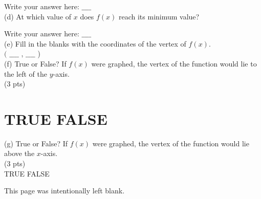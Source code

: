 \documentclass{ximera}
\begin{document}
Write your answer here: $\_\_\_\_$\\
(d) At which value of $x$ does $f(x)$ reach its minimum value?

Write your answer here: $\_\_\_\_$\\
(e) Fill in the blanks with the coordinates of the vertex of $f(x)$.\\
$($ $\_\_\_\_$ , $\_\_\_\_$ )\\
(f) True or False? If $f(x)$ were graphed, the vertex of the function would lie to the left of the $y$-axis.\\
(3 pts)

\section*{TRUE FALSE}
(g) True or False? If $f(x)$ were graphed, the vertex of the function would lie above the $x$-axis.\\
(3 pts)\\
TRUE FALSE

This page was intentionally left blank.
\end{document}
